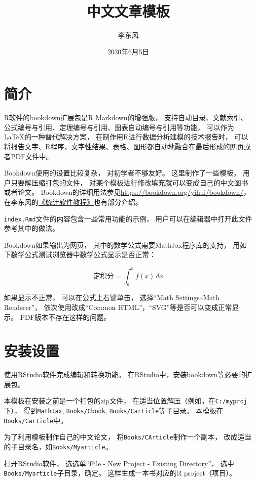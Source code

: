 \documentclass[
]{article}
\title{中文文章模板}
\author{李东风}
\date{2030年6月5日}
\begin{document}
\maketitle

{
\setcounter{tocdepth}{2}
\tableofcontents
}
\section{简介}\label{intro}

R软件的bookdown扩展包是R Markdown的增强版，
支持自动目录、文献索引、公式编号与引用、定理编号与引用、图表自动编号与引用等功能，
可以作为LaTeX的一种替代解决方案，
在制作用R进行数据分析建模的技术报告时，
可以将报告文字、R程序、文字性结果、表格、图形都自动地融合在最后形成的网页或者PDF文件中。

Bookdown使用的设置比较复杂，
对初学者不够友好。
这里制作了一些模板，
用户只要解压缩打包的文件，
对某个模板进行修改填充就可以变成自己的中文图书或者论文。
Bookdown的详细用法参见\url{https://bookdown.org/yihui/bookdown/}，
在李东风的\href{http://www.math.pku.edu.cn/teachers/lidf/docs/Rbook/html/_Rbook/index.html}{《统计软件教程》}也有部分介绍。

\texttt{index.Rmd}文件的内容包含一些常用功能的示例，
用户可以在编辑器中打开此文件参考其中的做法。

Bookdown如果输出为网页，
其中的数学公式需要MathJax程序库的支持，
用如下数学公式测试浏览器中数学公式显示是否正常：

\[
\text{定积分} = \int_a^b f(x) \,dx
\]

如果显示不正常，
可以在公式上右键单击，
选择``Math Settings--Math Renderer''，
依次使用改成``Common HTML''，``SVG''等是否可以变成正常显示。
PDF版本不存在这样的问题。

\section{安装设置}\label{usage-ins}

使用RStudio软件完成编辑和转换功能。
在RStudio中，安装bookdown等必要的扩展包。

本模板在安装之前是一个打包的zip文件，
在适当位置解压（例如，在\texttt{C:/myproj}下），
得到\texttt{MathJax}, \texttt{Books/Cbook}, \texttt{Books/Carticle}等子目录。
本模板在\texttt{Books/Carticle}中。

为了利用模板制作自己的中文论文，
将\texttt{Books/CArticle}制作一个副本，
改成适当的子目录名，如\texttt{Books/Myarticle}。

打开RStudio软件，
选选单``File - New Project - Existing Directory''，
选中\texttt{Books/Myarticle}子目录，确定。
这样生成一本书对应的R project（项目）。
\end{document}

